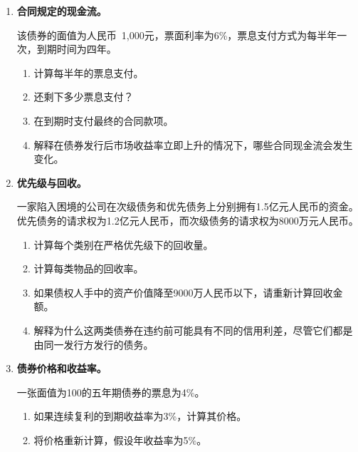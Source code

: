 \begin{enumerate}

\item \textbf{合同规定的现金流。}

该债券的面值为人民币~1,000元，票面利率为6\%，票息支付方式为每半年一次，到期时间为四年。

\begin{enumerate}

\item 计算每半年的票息支付。

\item 还剩下多少票息支付？

\item 在到期时支付最终的合同款项。

\item 解释在债券发行后市场收益率立即上升的情况下，哪些合同现金流会发生变化。

\end{enumerate}

\item \textbf{优先级与回收。}

一家陷入困境的公司在次级债务和优先债务上分别拥有1.5亿元人民币的资金。优先债务的请求权为1.2亿元人民币，而次级债务的请求权为8000万元人民币。

\begin{enumerate}

\item 计算每个类别在严格优先级下的回收量。

\item 计算每类物品的回收率。

\item 如果债权人手中的资产价值降至9000万人民币以下，请重新计算回收金额。

\item 解释为什么这两类债券在违约前可能具有不同的信用利差，尽管它们都是由同一发行方发行的债务。

\end{enumerate}

\item \textbf{债券价格和收益率。}

一张面值为100的五年期债券的票息为4\%。

\begin{enumerate}

\item 如果连续复利的到期收益率为3\%，计算其价格。

\item 将价格重新计算，假设年收益率为5\%。


\end{enumerate}
\end{enumerate}
